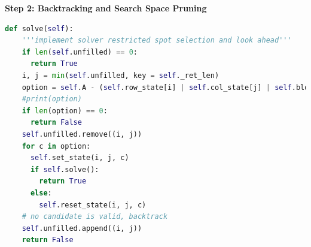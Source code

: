 \documentclass[../main.tex]{subfiles}
\begin{document}
\textbf{Step 2: Backtracking and Search Space Pruning} 
\begin{lstlisting}[language=Python]
  def solve(self):
    '''implement solver restricted spot selection and look ahead'''
    if len(self.unfilled) == 0:
      return True
    i, j = min(self.unfilled, key = self._ret_len)
    option = self.A - (self.row_state[i] | self.col_state[j] | self.block_state[i//3 ][j//3])
    #print(option)
    if len(option) == 0:
      return False
    self.unfilled.remove((i, j))
    for c in option:
      self.set_state(i, j, c)
      if self.solve():
        return True
      else:
        self.reset_state(i, j, c)
    # no candidate is valid, backtrack
    self.unfilled.append((i, j))
    return False
\end{lstlisting}
\end{document}
